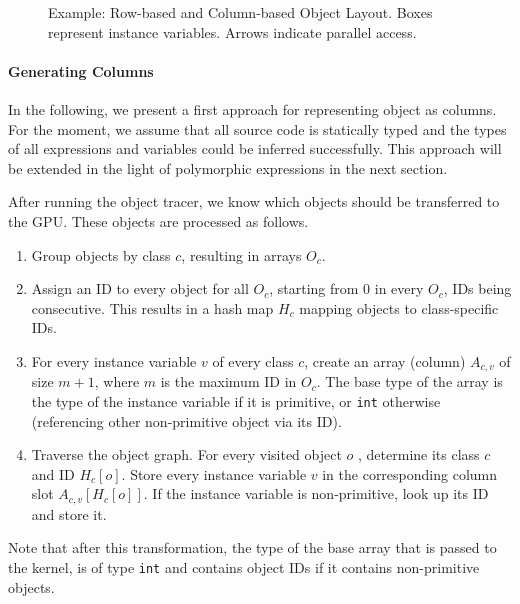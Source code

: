 \documentclass[preprint]{sigplanconf}
\begin{document}
\begin{figure}[!htp]
    \centering
    
    \caption{Example: Row-based and Column-based Object Layout. Boxes represent instance variables. Arrows indicate parallel access.}
    \label{fig:ex_obj_layout}%
\end{figure}

\paragraph{Generating Columns}
In the following, we present a first approach for representing object as columns. For the moment, we assume that all source code is statically typed and the types of all expressions and variables could be inferred successfully. This approach will be extended in the light of polymorphic expressions in the next section.

After running the object tracer, we know which objects should be transferred to the GPU. These objects are processed as follows.
\begin{enumerate}
    \item Group objects by class $c$, resulting in arrays $O_c$.
    \item Assign an ID to every object for all $O_c$, starting from $0$ in every $O_c$, IDs being consecutive. This results in a hash map $H_c$ mapping objects to class-specific IDs.
    \item For every instance variable $v$ of every class $c$, create an array (column) $A_{c,v}$ of size $m + 1$, where $m$ is the maximum ID in $O_c$. The base type of the array is the type of the instance variable if it is primitive, or \texttt{int} otherwise (referencing other non-primitive object via its ID).
    \item Traverse the object graph. For every visited object $o$ , determine its class $c$ and ID $H_c[o]$. Store every instance variable $v$ in the corresponding column slot $A_{c, v}[H_c[o]]$. If the instance variable is non-primitive, look up its ID and store it.
\end{enumerate}
Note that after this transformation, the type of the base array that is passed to the kernel, is of type \texttt{int} and contains object IDs if it contains non-primitive objects.
\end{document}
